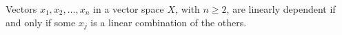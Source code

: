 Vectors $x_1, x_2, \ldots, x_n$ in a vector space $X$, with $n \geq 2$, are linearly dependent if and only if some $x_j$ is a linear combination of the others.
